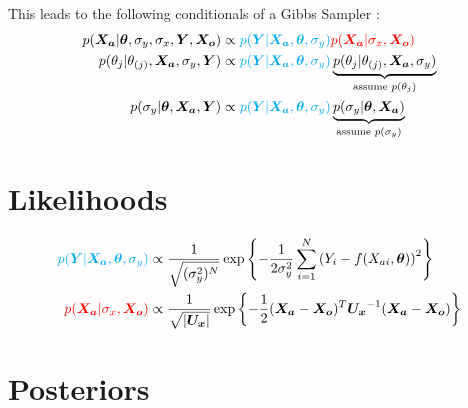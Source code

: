 \documentclass[10pt]{article}
\renewcommand{\vec}[1]{\boldsymbol{#1}}
\newcommand{\mat}[1]{\boldsymbol{#1}}
\begin{document}
This leads to the following conditionals of a Gibbs Sampler \cite{dellaportas_1995}:
\begin{align}
    p(\vec{X_a} | \vec{\theta}, \sigma_y, \sigma_x, \vec{Y}, \vec{X_o}) &\propto {\color{cyan} p(\vec{Y} | \vec{X_a}, \vec{\theta}, \sigma_y)} {\color{red} p(\vec{X_a} | \sigma_x, \vec{X_o})} \label{eq:posterior_X_a}\\
    p(\theta_j | \theta_{(j)}, \vec{X_a}, \sigma_y, \vec{Y}) &\propto {\color{cyan} p(\vec{Y} | \vec{X_a}, \vec{\theta}, \sigma_y)} \underbrace{p(\theta_j | \theta_{(j)}, \vec{X_a}, \sigma_{y})}_{\text{assume } p(\theta_j)} \label{eq:posterior_params} \\
    p(\sigma_y | \vec{\theta}, \vec{X_a}, \vec{Y}) &\propto {\color{cyan} p(\vec{Y} | \vec{X_a}, \vec{\theta}, \sigma_y)} \underbrace{p(\sigma_y | \vec{\theta}, \vec{X_a})}_{\text{assume } p(\sigma_y)} \label{eq:posterior_sigma_y}
\end{align}


\section{Likelihoods}
\begin{align}
    {\color{cyan} p(\vec{Y} | \vec{X_a}, \vec{\theta}, \sigma_y)} &\propto \frac{1}{\sqrt{(\sigma_y^2)^N}} \exp\left\{ - \frac{1}{2\sigma_y^2} \sum_{i=1}^N \left( Y_i - f(X_{ai}, \vec{\theta}) \right)^2 \right\} \\
    {\color{red} p(\vec{X_a} | \sigma_x, \vec{X_o})} &\propto \frac{1}{\sqrt{|\mat{U_x}|}} \exp\left\{ - \frac{1}{2} (\vec{X_a} - \vec{X_o})^T \mat{U_x}^{-1} (\vec{X_a} - \vec{X_o}) \right\}
\end{align}    


\section{Posteriors}
\end{document}
